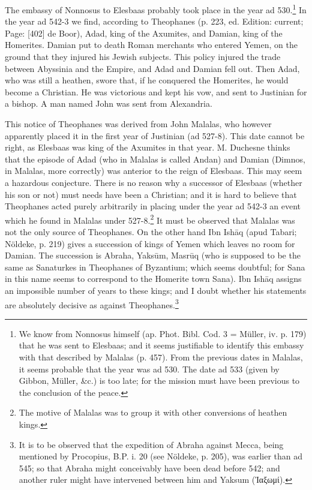 The embassy of Nonnosus to Elesbaas probably took place in the year ad 530.\footnote{We know from Nonnosus himself (ap. Phot. Bibl. Cod. 3 = Müller, iv. p. 179) that he was sent to Elesbaas; and it seems justifiable to identify this embassy with that described by Malalas (p. 457). From the previous dates in Malalas, it seems probable that the year was ad 530. The date ad 533 (given by Gibbon, Müller, \&c.) is too late; for the mission must have been previous to the conclusion of the peace.} In the year ad 542-3 we find, according to Theophanes (p. 223, ed. Edition: current; Page: [402] de Boor), Adad, king of the Axumites, and Damian, king of the Homerites. Damian put to death Roman merchants who entered Yemen, on the ground that they injured his Jewish subjects. This policy injured the trade between Abyssinia and the Empire, and Adad and Damian fell out. Then Adad, who was still a heathen, swore that, if he conquered the Homerites, he would become a Christian. He was victorious and kept his vow, and sent to Justinian for a bishop. A man named John was sent from Alexandria.

This notice of Theophanes was derived from John Malalas, who however apparently placed it in the first year of Justinian (ad 527-8). This date cannot be right, as Elesbaas was king of the Axumites in that year. M. Duchesne thinks that the episode of Adad (who in Malalas is called Andan) and Damian (Dimnos, in Malalas, more correctly) was anterior to the reign of Elesbaas. This may seem a hazardous conjecture. There is no reason why a successor of Elesbaas (whether his son or not) must needs have been a Christian; and it is hard to believe that Theophanes acted purely arbitrarily in placing under the year ad 542-3 an event which he found in Malalas under 527-8.\footnote{The motive of Malalas was to group it with other conversions of heathen kings.} It must be observed that Malalas was not the only source of Theophanes. On the other hand Ibn Ishāq (apud Tabari; Nöldeke, p. 219) gives a succession of kings of Yemen which leaves no room for Damian. The succession is Abraha, Yaksūm, Masrūq (who is supposed to be the same as Sanaturkes in Theophanes of Byzantium; which seems doubtful; for Sana in this name seems to correspond to the Homerite town Sana). Ibn Ishāq assigns an impossible number of years to these kings; and I doubt whether his statements are absolutely decisive as against Theophanes.\footnote{It is to be observed that the expedition of Abraha against Mecca, being mentioned by Procopius, B.P. i. 20 (see Nöldeke, p. 205), was earlier than ad 545; so that Abraha might conceivably have been dead before 542; and another ruler might have intervened between him and Yaksum (\textgreek{\texthebrew{Ἰ}αξωμί}).}

